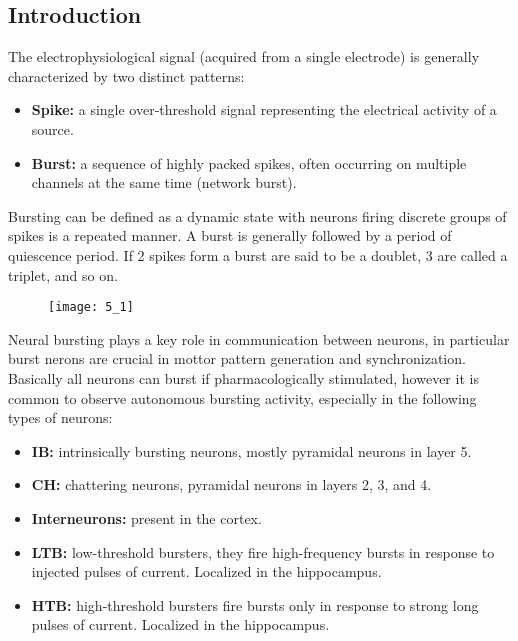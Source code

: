 \subsection{Introduction}
The electrophysiological signal (acquired from a single electrode) is generally
characterized by two distinct patterns:
\begin{itemize}
    \item \textbf{Spike:} a single over-threshold signal representing the
    electrical activity of a source.
    \item \textbf{Burst:} a sequence of highly packed spikes, often occurring on
    multiple channels at the same time (network burst).
\end{itemize}
Bursting can be defined as a dynamic state with neurons firing discrete groups of
spikes is a repeated manner. A burst is generally followed by a period of quiescence
period. If 2 spikes form a burst are said to be a doublet, 3 are called a triplet,
and so on.
\begin{figure}[H]
    \texttt{[image: 5\_1]}
    \centering
\end{figure}
Neural bursting plays a key role in communication between neurons, in particular
burst nerons are crucial in mottor pattern generation and synchronization.
Basically all neurons can burst if pharmacologically stimulated, however
it is common to observe autonomous bursting activity, especially in the following
types of neurons:
\begin{itemize}
    \item \textbf{IB:} intrinsically bursting neurons, mostly pyramidal neurons in
    layer 5.
    \item \textbf{CH:} chattering neurons, pyramidal neurons in layers 2, 3, and 4.
    \item \textbf{Interneurons:} present in the cortex.
    \item \textbf{LTB:} low-threshold bursters, they fire high-frequency bursts in
    response to injected pulses of current. Localized in the hippocampus.
    \item \textbf{HTB:} high-threshold bursters fire bursts only in response to
    strong long pulses of current. Localized in the hippocampus.
\end{itemize}
